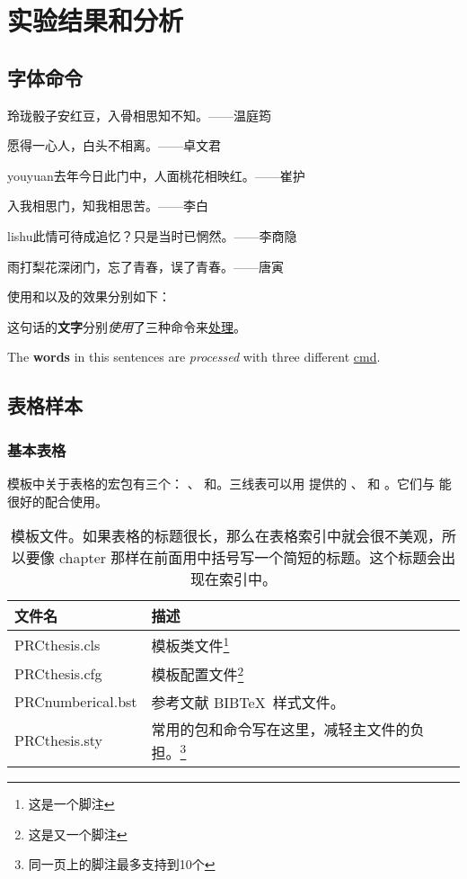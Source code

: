 \chapter{实验结果和分析}

\section{字体命令}\label{txt:FreqCmd}
{\kaishu 玲珑骰子安红豆，入骨相思知不知。\hfill ——温庭筠}
	
{\fangsong 愿得一心人，白头不相离。\hfill ——卓文君}
		
{\ifcsname youyuan\endcsname\youyuan\else[无 \cs{youyuan} 字体。]\fi 去年今日此门中，人面桃花相映红。\hfill ——崔护}
			
{\heiti 入我相思门，知我相思苦。\hfill ——李白}
				
{\ifcsname lishu\endcsname\lishu\else[无 \cs{lishu} 字体。]\fi 此情可待成追忆？只是当时已惘然。\hfill ——李商隐}
					
{\songti 雨打梨花深闭门，忘了青春，误了青春。\hfill ——唐寅}

使用和以及的效果分别如下：

这句话的\textbf{文字}分别\textit{使用}了三种命令来\underline{处理}。

The \textbf{words} in this sentences are \textit{processed} with three different \underline{cmd}.

\section{表格样本}

\subsection{基本表格}
\label{sec:basictable}

模板中关于表格的宏包有三个： 、 和。三线表可以用 提供的 、 和 。它们与 能很好的配合使用。
\begin{table}[htb]
	\centering
	\begin{minipage}[t]{0.9\linewidth} %
	\caption[模板文件]{模板文件。如果表格的标题很长，那么在表格索引中就会很不美观，所以要像 chapter 那样在前面用中括号写一个简短的标题。这个标题会出现在索引中。}
	\label{tab:template-files}
	\begin{tabularx}{\linewidth}{lX}
		\toprule
		{\heiti 文件名} & {\heiti 描述} \\
		\midrule
		PRCthesis.cls & 模板类文件\footnote{这是一个脚注}\\
		PRCthesis.cfg & 模板配置文件\footnote{这是又一个脚注}\\
		PRCnumberical.bst & 参考文献 BIB\TeX\ 样式文件。\\
		PRCthesis.sty & 常用的包和命令写在这里，减轻主文件的负担。\footnote{同一页上的脚注最多支持到10个}\\
		\bottomrule
		\end{tabularx}
	\end{minipage}
\end{table}

